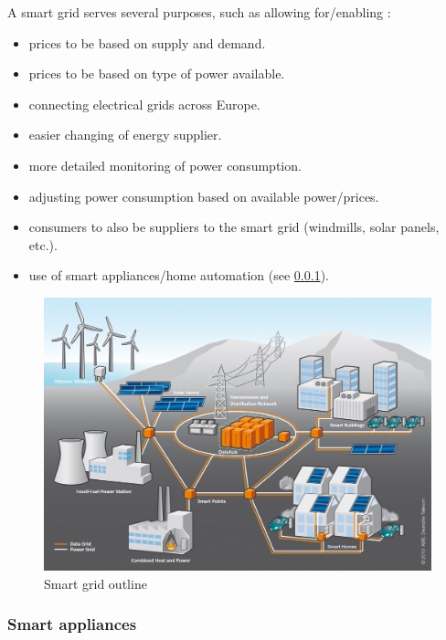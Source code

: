 A smart grid serves several purposes, such as allowing for/enabling \cite{smartgrid_gov, directive_2009_72_EC}:
\begin{itemize}
	\item prices to be based on supply and demand.
	\item prices to be based on type of power available.
	\item connecting electrical grids across Europe.
	\item easier changing of energy supplier.
	\item more detailed monitoring of power consumption.
	\item adjusting power consumption based on available power/prices.
	\item consumers to also be suppliers to the smart grid (windmills, solar panels, etc.).
	\item use of smart appliances/home automation (see \cref{background:smart_appliances}).
\end{itemize}

\begin{figure}
	\includegraphics[width=\textwidth]{figures/SmartGrid_Ueberblick_ohneLegende.jpg}
	\caption{Smart grid outline\protect\footnotemark}
	\label{fig:background:smartgrid}
\end{figure}

\subsubsection{Smart appliances \cite{smart_appliances}}
\label{background:smart_appliances}


